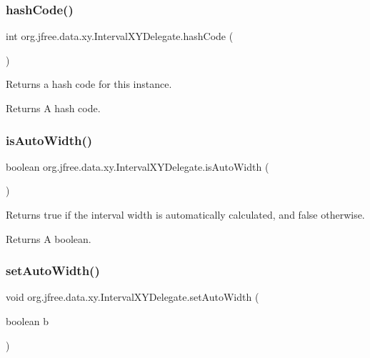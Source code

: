 \subsubsection{\texorpdfstring{hash\+Code()}{hashCode()}}
{\footnotesize\ttfamily int org.\+jfree.\+data.\+xy.\+Interval\+X\+Y\+Delegate.\+hash\+Code (\begin{DoxyParamCaption}{ }\end{DoxyParamCaption})}

Returns a hash code for this instance.

\begin{DoxyReturn}{Returns}
A hash code. 
\end{DoxyReturn}
\mbox{\label{classorg_1_1jfree_1_1data_1_1xy_1_1_interval_x_y_delegate_ab44b13f9cd61ebc7b2ed8741bea98b1d}} 
\subsubsection{\texorpdfstring{is\+Auto\+Width()}{isAutoWidth()}}
{\footnotesize\ttfamily boolean org.\+jfree.\+data.\+xy.\+Interval\+X\+Y\+Delegate.\+is\+Auto\+Width (\begin{DoxyParamCaption}{ }\end{DoxyParamCaption})}

Returns {\ttfamily true} if the interval width is automatically calculated, and {\ttfamily false} otherwise.

\begin{DoxyReturn}{Returns}
A boolean. 
\end{DoxyReturn}
\mbox{\label{classorg_1_1jfree_1_1data_1_1xy_1_1_interval_x_y_delegate_a0ccde42725037c83d05fa1b57e824caa}} 
\subsubsection{\texorpdfstring{set\+Auto\+Width()}{setAutoWidth()}}
{\footnotesize\ttfamily void org.\+jfree.\+data.\+xy.\+Interval\+X\+Y\+Delegate.\+set\+Auto\+Width (\begin{DoxyParamCaption}\item[{boolean}]{b }\end{DoxyParamCaption})}

